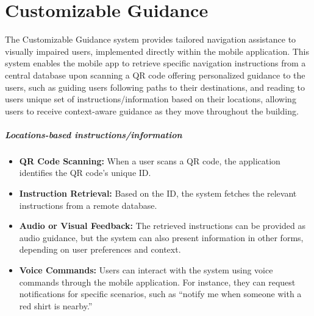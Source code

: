 \section{Customizable Guidance}

The Customizable Guidance system provides tailored navigation assistance to visually impaired users, implemented directly within the mobile application. This system enables the mobile app to retrieve specific navigation instructions from a central database upon scanning a QR code offering personalized guidance to the users, such as guiding users following paths to their destinations, and reading to users unique set of instructions/information based on their locations, allowing users to receive context-aware guidance as they move throughout the building.

\subparagraph{Locations-based instructions/information}
\begin{itemize}
	\item \textbf{QR Code Scanning:} When a user scans a QR code, the application identifies the QR code's unique ID.
	\item \textbf{Instruction Retrieval:} Based on the ID, the system fetches the relevant instructions from a remote database.
	\item \textbf{Audio or Visual Feedback:} The retrieved instructions can be provided as audio guidance, but the system can also present information in other forms, depending on user preferences and context.
	\item \textbf{Voice Commands:} Users can interact with the system using voice commands through the mobile application. For instance, they can request notifications for specific scenarios, such as “notify me when someone with a red shirt is nearby.”
\end{itemize}

